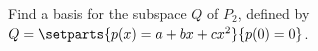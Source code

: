 Find a basis for the subspace $Q$ of $P_2$, defined by $Q = \setparts{p(x) = a + bx + cx^2}{p(0) = 0}$.